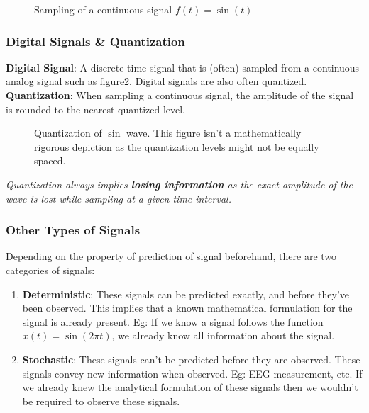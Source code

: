\documentclass[letterpaper,12pt]{article}
\begin{document}
\begin{figure}
    \centering
    \caption{Sampling of a continuous signal $f(t) = \sin(t)$}\label{fig:sampling_signal}
\end{figure}

\subsubsection*{Digital Signals \& Quantization}
\textbf{Digital Signal}: A discrete time signal that is (often) sampled from a continuous analog signal such as figure\ref{fig:sampling_signal_quantized}. Digital signals are also often quantized. \\
\textbf{Quantization}: When sampling a continuous signal, the amplitude of the signal is rounded to the nearest quantized level.

\begin{figure}[!ht]
    \centering
    \caption{Quantization of $\sin$ wave. This figure isn't a mathematically rigorous depiction as the quantization levels might not be equally spaced.}\label{fig:sampling_signal_quantized}
\end{figure}

\textit{Quantization always implies \textbf{losing information} as the exact amplitude of the wave is lost while sampling at a given time interval.}

\subsubsection*{Other Types of Signals}
Depending on the property of prediction of signal beforehand, there are two categories of signals:
\begin{enumerate}
    \item \textbf{Deterministic}: These signals can be predicted exactly, and before they've been observed. This implies that a known mathematical formulation for the signal is already present. Eg: If we know a signal follows the function \(x(t) = \sin(2{\pi}t)\), we already know all information about the signal.
    \item \textbf{Stochastic}: These signals can't be predicted before they are observed. These signals convey new information when observed.  Eg: EEG measurement, etc. If we already knew the analytical formulation of these signals then we wouldn't be required to observe these signals.
\end{enumerate}
\end{document}
